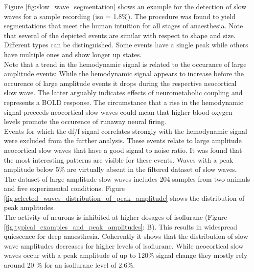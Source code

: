 Figure \ref{fig:slow_wave_segmentation} shows an example for the detection of slow waves for a sample recording (iso = 1.8\%). The procedure was found to yield segmentations that meet the human intuition for all stages of anaesthesia. Note that several of the depicted events are similar with respect to shape and size. Different types can be distinguished. Some events have a single peak while others have multiple ones and show longer up states. \\
 Note that a trend in the hemodynamic signal is related to the occurance of large amplitude events: While the hemodynamic signal appears to increase before the occurence of large amplitude events it drops during the respective neocortical slow wave. The latter arguably indicates effects of neurometabolic coupling and represents a BOLD response. The circumstance that a rise in the hemodynamic signal preceeds neocortical slow waves could mean that higher blood oxygen levels promote the occurence of runaway neural firing. \\
 Events for which the df/f signal correlates strongly with the hemodynamic signal were excluded from the further analysis. These events relate to large amplitude neocortical slow waves that have a good signal to noise ratio. It was found that the most interesting patterns are visible for these events. Waves with a peak amplitude below 5\% are virtually absent in the filtered dataset of slow waves. The dataset of large amplitude slow waves includes 204 samples from two animals and five experimental conditions. Figure \ref{fig:selected_waves_distribution_of_peak_amplitude} shows the distribution of peak amplitudes.\\
The activity of neurons is inhibited at higher dosages of isoflurane (Figure \ref{fig:typical_examples_and_peak_amplitudes}: B). This results in widespread quiescence for deep anaesthesia. Coherently it shows that the distribution of slow wave amplitudes decreases for higher levels of isoflurane. While neocortical slow waves occur with a peak amplitude of up to 120\% signal change they mostly rely around 20 \% for an isoflurane level of 2.6\%. \\
